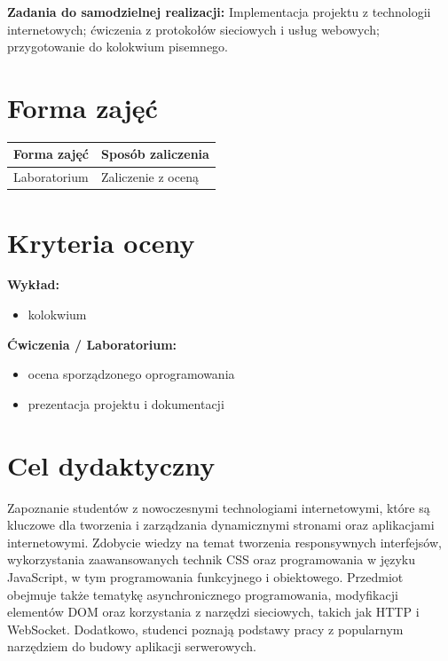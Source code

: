 \documentclass[12pt, a4paper]{article}
\newcommand{\thdrule}{\noalign{\global\setlength{\extrarowheight}{0pt}}}
\newcommand{\thdend}{\noalign{\global\setlength{\extrarowheight}{3pt}}}
\begin{document}
\vspace{4pt}
\noindent\textbf{Zadania do samodzielnej realizacji:} Implementacja projektu z technologii internetowych; ćwiczenia z protokołów sieciowych i usług webowych; przygotowanie do kolokwium pisemnego.

\section{Forma zajęć}

\begin{center}
{\scriptsize
\begin{tabular}{m{5cm}m{8cm}}
\thdrule\toprule
\rowcolor{pjatkRed} {\color{white}\textbf{Forma zajęć}} & {\color{white}\textbf{Sposób zaliczenia}} \\
\midrule\thdend
  \rowcolor{tableRowLight} Laboratorium & Zaliczenie z oceną \\
\bottomrule
\end{tabular}}
\end{center}

\section{Kryteria oceny}

\textbf{Wykład:}
\begin{itemize}
  \item kolokwium
\end{itemize}
\vspace{4pt}
\textbf{Ćwiczenia / Laboratorium:}
\begin{itemize}
  \item ocena sporządzonego oprogramowania
  \item prezentacja projektu i dokumentacji
\end{itemize}


\section{Cel dydaktyczny}

Zapoznanie studentów z nowoczesnymi technologiami internetowymi, które są kluczowe dla tworzenia i zarządzania dynamicznymi stronami oraz aplikacjami internetowymi. Zdobycie wiedzy na temat tworzenia responsywnych interfejsów, wykorzystania zaawansowanych technik CSS oraz programowania w języku JavaScript, w tym programowania funkcyjnego i obiektowego. Przedmiot obejmuje także tematykę asynchronicznego programowania, modyfikacji elementów DOM oraz korzystania z narzędzi sieciowych, takich jak HTTP i WebSocket. Dodatkowo, studenci poznają podstawy pracy z popularnym narzędziem do budowy aplikacji serwerowych.
\end{document}
